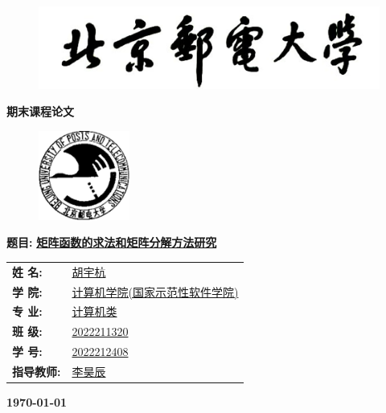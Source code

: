 \documentclass[UTF8, 12pt, a4paper, oneside]{ctexart}
\begin{document}
	\sloppy
	\thispagestyle{empty}
    \begin{figure}[t]
		\centering
		\includegraphics[width=13cm]{logo1.jpg}
	\end{figure}

    \begin{center}
        \Huge\textbf{期末课程论文}
    \end{center}
	\vspace*{1em}
    \begin{figure}[htbp]
		\centering
		\includegraphics[width=3cm]{logo2.jpg}
	\end{figure}
		\begin{center}
			\Large\textbf{题目:} \underline{\textbf{矩阵函数的求法和矩阵分解方法研究}} 
		\end{center}
    \vspace*{3em}
	\begin{table}[htbp]
		\hspace*{8em}
		\large
		\begin{tabular}{ll}
		\textbf{姓 \hspace*{1.3em}  名:} & \underline{胡宇杭} \\
		\textbf{学 \hspace*{1.3em}  院:} & \underline{计算机学院(国家示范性软件学院)} \\
        \textbf{专 \hspace*{1.3em}  业:} & \underline{计算机类} \\
        \textbf{班 \hspace*{1.3em}  级:} & \underline{2022211320} \\
        \textbf{学 \hspace*{1.3em}  号:} & \underline{2022212408} \\
        \textbf{指导教师:} & \underline{李昊辰} \\
		\end{tabular}
	\end{table}
    \vspace*{2em}
    \begin{center}
        \Large\textbf{\today}
    \end{center}
    \setcounter{page}{1}
	
    
	\tableofcontents
    \newpage
    
    
    
    
    
\end{document}
